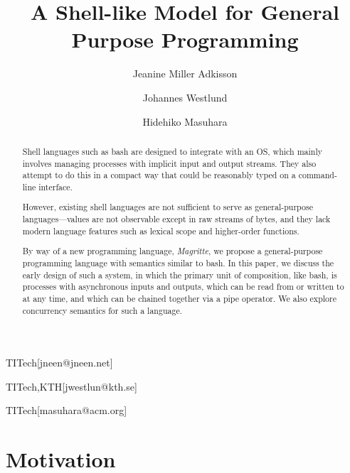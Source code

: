 \documentclass[english,PRO]{ipsj}
\begin{document}
\title{A Shell-like Model for General Purpose Programming}



\author{Jeanine Miller Adkisson}{TITech}[jneen@jneen.net]
\author{Johannes Westlund}{TITech,KTH}[jwestlun@kth.se]
\author{Hidehiko Masuhara}{TITech}[masuhara@acm.org]



\begin{abstract}
Shell languages such as bash are designed to integrate with an OS, which mainly involves managing processes with implicit input and output streams. They also attempt to do this in a compact way that could be reasonably typed on a command-line interface.

However, existing shell languages are not sufficient to serve as general-purpose languages---values are not observable except in raw streams of bytes, and they lack modern language features such as lexical scope and higher-order functions.

By way of a new programming language, \emph{Magritte}, we propose a general-purpose programming language with semantics similar to bash. In this paper, we discuss the early design of such a system, in which the primary unit of composition, like bash, is processes with asynchronous inputs and outputs, which can be read from or written to at any time, and which can be chained together via a pipe operator. We also explore concurrency semantics for such a language.
\end{abstract}

\maketitle

\section{Motivation}\label{motivation}
\end{document}
